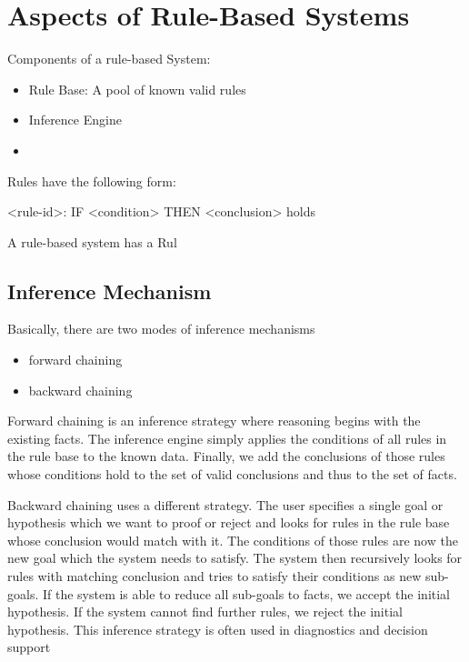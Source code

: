 \chapter{Aspects of Rule-Based Systems}\label{ch:aspects-of-rule-based-systems}

Components of a rule-based System:

\begin{itemize}
    \item Rule Base: A pool of known valid rules
    \item Inference Engine
    \item
\end{itemize}


Rules have the following form:

<rule-id>: IF <condition> THEN <conclusion> holds

A rule-based system has a Rul





\section{Inference Mechanism}

Basically, there are two modes of inference mechanisms\cite{https://doi.org/10.1002/widm.11}

\begin{itemize}
    \item forward chaining
    \item backward chaining
\end{itemize}


Forward chaining is an inference strategy where reasoning begins with the existing facts.
The inference engine simply applies the conditions of all rules in the rule base to the known data.
Finally, we add the conclusions of those rules whose conditions hold to the set of valid conclusions and thus to the set of facts.

Backward chaining uses a different strategy\cite{al2015comparison}.
The user specifies a single goal or hypothesis which we want to proof or reject and looks for rules in the rule base whose conclusion would match with it.
The conditions of those rules are now the new goal which the system needs to satisfy.
The system then recursively looks for rules with matching conclusion and tries to satisfy their conditions as new sub-goals.
If the system is able to reduce all sub-goals to facts, we accept the initial hypothesis.
If the system cannot find further rules, we reject the initial hypothesis.
This inference strategy is often used in diagnostics and decision support\cite{https://doi.org/10.1002/widm.11}

